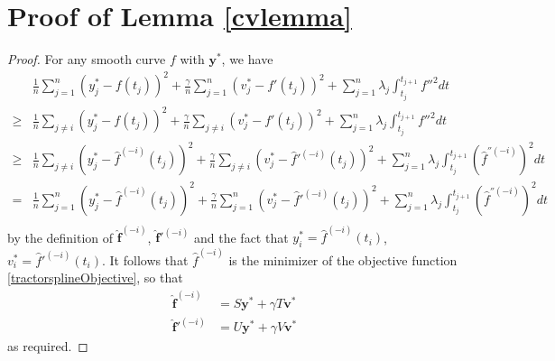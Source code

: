 \section{Proof of Lemma \ref{cvlemma}}
\begin{proof}
For any smooth curve $f$ with $\mathbf{y}^*$, we have 
\begin{align*}
&\frac{1}{n} \sum_{j=1}^n\left(y_j^*-f(t_j)\right)^2+\frac{\gamma}{n} \sum_{j=1}^n\left(v_j^*-f'(t_j)\right)^2+\sum_{j=1}^{n} \lambda_j\int_{t_j}^{t_{j+1}} f''^2dt \\
\geq &\frac{1}{n} \sum_{j\neq i}\left(y_j^*-f(t_j)\right)^2+\frac{\gamma}{n} \sum_{j\neq i}\left(v_j^*-f'(t_j)\right)^2+\sum_{j=1}^{n} \lambda_j\int_{t_j}^{t_{j+1}} f''^2dt\\
\geq &\frac{1}{n}\sum_{j\neq i}\left(y_j^*-\hat{f}^{(-i)}(t_j)\right)^2+\frac{\gamma}{n} \sum_{j\neq i}\left(v_j^*-\hat{f}'^{(-i)}(t_j)\right)^2+\sum_{j=1}^{n} \lambda_j\int_{t_j}^{t_{j+1}}  \left(\hat{f}^{''(-i)}\right)^2dt\\
= &\frac{1}{n}\sum_{j=1}^{n}\left(y_j^*-\hat{f}^{(-i)}(t_j)\right)^2+\frac{\gamma}{n} \sum_{j=1}^{n}\left(v_j^*-\hat{f}'^{(-i)}(t_j)\right)^2+\sum_{j=1}^{n} \lambda_j\int_{t_j}^{t_{j+1}}  \left(\hat{f}^{''(-i)}\right)^2dt\\
\end{align*}
by the definition of $\mathbf{\hat{f}}^{(-i)}$, $\mathbf{\hat{f}}'^{(-i)}$ and the fact that $y_i^*=\hat{f}^{(-i)}(t_i)$, $v_i^*=\hat{f}'^{(-i)}(t_i)$. It follows that $\hat{f}^{(-i)}$ is the minimizer of the objective function \eqref{tractorsplineObjective}, so that
\begin{align*}
\mathbf{\hat{f}}^{(-i)}&=S\mathbf{y}^*+\gamma T\mathbf{v}^*\\
\mathbf{\hat{f}}'^{(-i)}&=U\mathbf{y}^*+\gamma V\mathbf{v}^*
\end{align*}
as required.
\end{proof}



